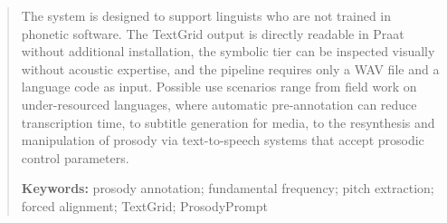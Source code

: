 \begin{abstract}
The system is designed to support linguists who are not trained in phonetic software. The TextGrid output is directly readable in Praat without additional installation, the symbolic tier can be inspected visually without acoustic expertise, and the pipeline requires only a WAV file and a language code as input. Possible use scenarios range from field work on under-resourced languages, where automatic pre-annotation can reduce transcription time, to subtitle generation for media, to the resynthesis and manipulation of prosody via text-to-speech systems that accept prosodic control parameters.

\bigskip
\noindent\textbf{Keywords:} prosody annotation; fundamental frequency; pitch extraction; forced alignment; TextGrid; ProsodyPrompt


\newpage
\end{abstract}
